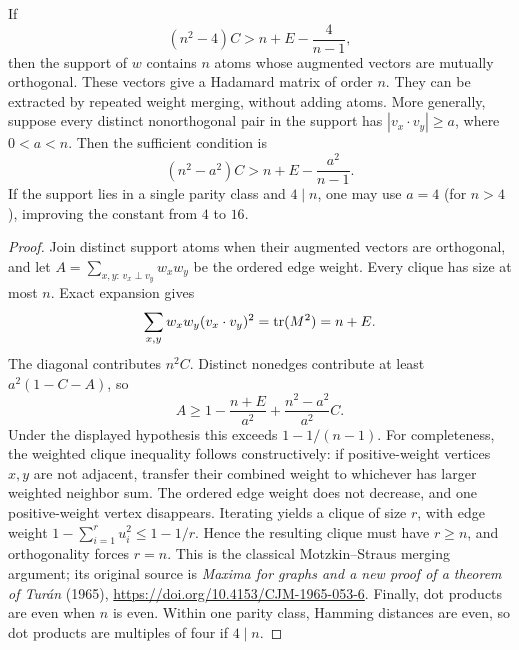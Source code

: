 \begin{theorem}
\label{s10:thm:discrete-rounding}
If
\begin{equation}\label{s10:eq:discrete-certificate}
 (n^2-4)C>n+E-\frac4{n-1},
\end{equation}
then the support of $w$ contains $n$ atoms whose augmented vectors are
mutually orthogonal. These vectors give a Hadamard matrix of order $n$.
They can be extracted by repeated weight merging, without adding atoms.
More generally, suppose every distinct nonorthogonal pair in the support
has $|v_x\cdot v_y|\ge a$, where $0<a<n$. Then the sufficient condition is
\[
 (n^2-a^2)C>n+E-\frac{a^2}{n-1}.
\]
If the support lies in a single parity class and $4\mid n$, one may
use $a=4$ (for $n>4$), improving the constant from $4$ to $16$.
\end{theorem}
\begin{proof}
Join distinct support atoms when their augmented vectors are orthogonal,
and let $A=\sum_{x,y:\,v_x\perp v_y}w_xw_y$ be the ordered edge weight.
Every clique has size at most $n$. Exact expansion gives
\[
 \sum_{x,y}w_xw_y(v_x\cdot v_y)^2=\operatorname{tr}(M^2)=n+E.
\]
The diagonal contributes $n^2C$. Distinct nonedges contribute at least
$a^2(1-C-A)$, so
\[
 A\ge1-\frac{n+E}{a^2}+\frac{n^2-a^2}{a^2}C.
\]
Under the displayed hypothesis this exceeds $1-1/(n-1)$.
For completeness, the weighted clique inequality follows constructively:
if positive-weight vertices $x,y$ are not adjacent, transfer their combined
weight to whichever has larger weighted neighbor sum. The ordered edge
weight does not decrease, and one positive-weight vertex disappears.
Iterating yields a clique of size $r$, with edge weight
$1-\sum_{i=1}^r u_i^2\le1-1/r$. Hence the resulting clique must have
$r\ge n$, and orthogonality forces $r=n$. This is the classical
Motzkin--Straus merging argument; its original source is
\emph{Maxima for graphs and a new proof of a theorem of Tur\'an}
(1965), \url{https://doi.org/10.4153/CJM-1965-053-6}.
Finally, dot products are even when $n$ is even. Within one parity class,
Hamming distances are even, so dot products are multiples of four if
$4\mid n$.
\end{proof}

